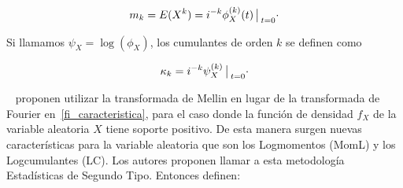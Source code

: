 \begin{align}
\label{MomentosPrimerTipo}
m_k=E(X^k)=i^{-k} \phi_X^{(k)}(t)\big\arrowvert _{t=0}\cdot
\end{align}

Si llamamos $\psi_X=\log(\phi_X)$, los cumulantes de orden $k$ se definen como 

\begin{align}
\label{CumulantePrimerTipo}
\kappa_k=i^{-k} \psi_X^{(k)}\big\arrowvert _{t=0}\cdot
\end{align}

~\citet{nicolas2002} proponen utilizar la transformada de Mellin en lugar de la transformada de Fourier en~\eqref{fi_caracteristica}, para el caso donde la función de densidad $f_X$ de la variable aleatoria $X$ tiene soporte positivo. De esta manera surgen nuevas características para la variable aleatoria que son los Logmomentos (MomL) y los  Logcumulantes (LC). Los autores proponen llamar a esta metodología Estadísticas de Segundo Tipo. Entonces definen:

